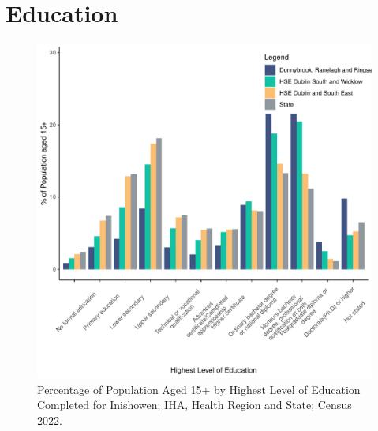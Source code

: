 \documentclass{article}
\begin{document}
\section{Education}\label{sect:Edu}
\begin{figure}[H]
	\centering
	\includegraphics[width = 120mm]{../figures/EduED.pdf}
	\caption{Percentage of Population Aged 15+ by Highest Level of Education Completed for Inishowen; IHA, Health Region and State; Census 2022.}
	\label{fig:vbnv}
	\end{figure}
\end{document}
